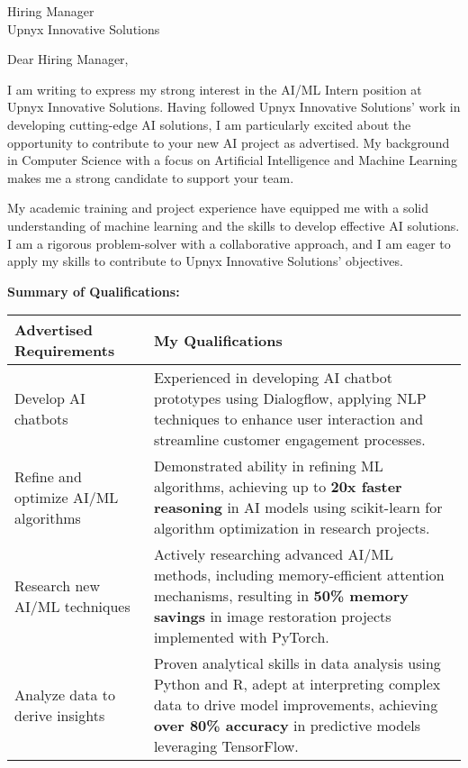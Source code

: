 \documentclass[11pt]{letter}
\date{\today}
\begin{document}
\begin{letter}{Hiring Manager\\
Upnyx Innovative Solutions\\
 }

\opening{Dear Hiring Manager,}

I am writing to express my strong interest in the AI/ML Intern position at Upnyx Innovative Solutions.  Having followed Upnyx Innovative Solutions' work in developing cutting-edge AI solutions, I am particularly excited about the opportunity to contribute to your new AI project as advertised. My background in Computer Science with a focus on Artificial Intelligence and Machine Learning makes me a strong candidate to support your team.

My academic training and project experience have equipped me with a solid understanding of machine learning and the skills to develop effective AI solutions. I am a rigorous problem-solver with a collaborative approach, and I am eager to apply my skills to contribute to Upnyx Innovative Solutions' objectives.

\vspace{0.2cm}
\textbf{Summary of Qualifications:}
\vspace{0.1cm}

\renewcommand{\arraystretch}{1.25}
{\small
\begin{tabularx}{\textwidth}{@{}p{}X@{}}
\textbf{Advertised Requirements} & \textbf{My Qualifications} \\

\hline
Develop AI chatbots & Experienced in developing AI chatbot prototypes using Dialogflow, applying NLP techniques to enhance user interaction and streamline customer engagement processes. \\

Refine and optimize AI/ML algorithms & Demonstrated ability in refining ML algorithms, achieving up to \textbf{20x faster reasoning} in AI models using scikit-learn for algorithm optimization in research projects. \\

Research new AI/ML techniques & Actively researching advanced AI/ML methods, including memory-efficient attention mechanisms, resulting in \textbf{50\% memory savings} in image restoration projects implemented with PyTorch. \\

Analyze data to derive insights & Proven analytical skills in data analysis using Python and R, adept at interpreting complex data to drive model improvements, achieving \textbf{over 80\% accuracy} in predictive models leveraging TensorFlow. \\


\end{tabularx}}
\end{letter}
\end{document}
